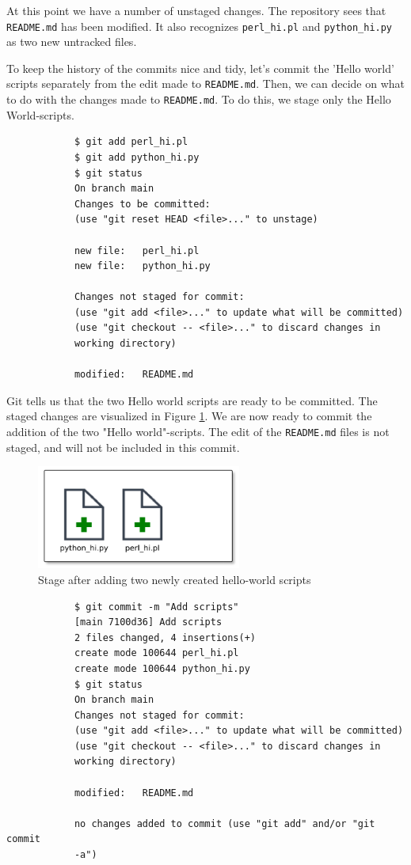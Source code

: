 \documentclass[../main/git_course_main.tex]{subfiles}
\begin{document}
	At this point we have a number of unstaged changes. The repository sees that \verb$README.md$
	has been modified. It also recognizes \verb$perl_hi.pl$ and \verb$python_hi.py$ as two new untracked files.
	
	To keep the history of the commits nice and tidy, let's commit the 'Hello world' scripts separately from the edit made to \verb$README.md$. Then, we can decide on what to do with the changes made to \verb$README.md$. To do this, we stage only the Hello World-scripts.
	
	\begin{codebox}
		\begin{lstlisting}
			$ git add perl_hi.pl
			$ git add python_hi.py
			$ git status
			On branch main
			Changes to be committed:
			(use "git reset HEAD <file>..." to unstage)
			
			new file:   perl_hi.pl
			new file:   python_hi.py
			
			Changes not staged for commit:
			(use "git add <file>..." to update what will be committed)
			(use "git checkout -- <file>..." to discard changes in 
			working directory)
			
			modified:   README.md
		\end{lstlisting}
	\end{codebox}
	
	Git tells us that the two Hello world scripts are ready to be committed. The staged changes are visualized in Figure \ref{fig:second_stage}. We are now ready to commit
	the addition of the two "Hello world"-scripts. The edit of the \verb$README.md$
	files is not staged, and will not be included in this commit.
	
	\begin{figure}[h!]
		\centering
		\includegraphics[width=0.6\textwidth
		]{../visualizations/chapter2/251_stage_created_scripts.pdf}
		\caption{Stage after adding two newly created hello-world scripts}
		\label{fig:second_stage}
	\end{figure}
	
	\begin{codebox}
		\begin{lstlisting}
			$ git commit -m "Add scripts"
			[main 7100d36] Add scripts
			2 files changed, 4 insertions(+)
			create mode 100644 perl_hi.pl
			create mode 100644 python_hi.py
			$ git status
			On branch main
			Changes not staged for commit:
			(use "git add <file>..." to update what will be committed)
			(use "git checkout -- <file>..." to discard changes in 
			working directory)
			
			modified:   README.md
			
			no changes added to commit (use "git add" and/or "git commit 
			-a")
		\end{lstlisting}
	\end{codebox}
	
\end{document}
